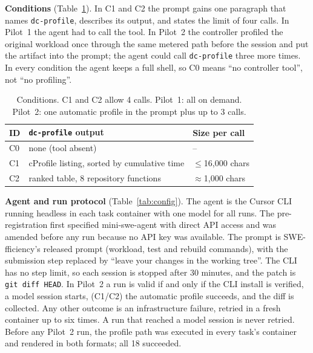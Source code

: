 \documentclass[conference]{IEEEtran}
\newcommand{\tool}{\texttt{dc-profile}}
\begin{document}
\textbf{Conditions} (Table~\ref{tab:conditions}). In C1 and C2 the prompt gains
one paragraph that names \tool{}, describes its output, and states the limit
of four calls. In Pilot~1 the agent had to call the tool. In Pilot~2 the
controller profiled the original workload once through the same metered path
before the session and put the artifact into the prompt; the agent could call
\tool{} three more times. In every condition the agent keeps a full shell, so
C0 means ``no controller tool'', not ``no profiling''.

\begin{table}[t]
\caption{Conditions. C1 and C2 allow 4 calls. Pilot~1: all on demand.
Pilot~2: one automatic profile in the prompt plus up to 3 calls.}
\label{tab:conditions}
\centering
\footnotesize
\setlength{\tabcolsep}{3pt}
\begin{tabular}{@{}lll@{}}
\toprule
ID & \tool{} output & Size per call \\
\midrule
C0 & none (tool absent) & -- \\
C1 & cProfile listing, sorted by cumulative time & $\le$16{,}000 chars \\
C2 & ranked table, 8 repository functions & $\approx$1{,}000 chars \\
\bottomrule
\end{tabular}
\end{table}

\textbf{Agent and run protocol} (Table~\ref{tab:config}). The agent is the
Cursor CLI running headless in each task container with one model for all
runs. The pre-registration first specified mini-swe-agent with direct API
access and was amended before any run because no API key was available. The
prompt is SWE-fficiency's released prompt (workload, test and rebuild
commands), with the submission step replaced by ``leave your changes in the
working tree''. The CLI has no step limit, so each session is stopped after 30
minutes, and the patch is \texttt{git diff HEAD}. In Pilot~2 a run is valid
if and only if the CLI install is verified, a model session starts, (C1/C2)
the automatic profile succeeds, and the diff is collected. Any other outcome
is an infrastructure failure, retried in a fresh container up to six times.
A run that reached a model session is never retried. Before any Pilot~2 run,
the profile path was executed in every task's container and rendered in both
formats; all 18 succeeded.
\end{document}

